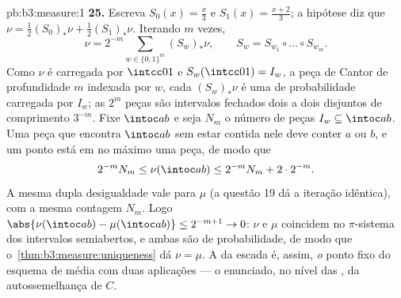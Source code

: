 \begin{solution}{pb:b3:measure:1}
\textbf{25.} Escreva $S_0(x) = \frac x3$ e $S_1(x) =
\frac{x+2}3$; a hipótese diz que $\nu = \frac12(S_0)_*\nu +
\frac12(S_1)_*\nu$. Iterando $m$ vezes,
\[
\nu = 2^{-m}\sum_{w \in \{0,1\}^m}(S_w)_*\nu,
\qquad S_w = S_{w_1}\circ\dots\circ S_{w_m}.
\]
Como $\nu$ é carregada por $\intcc01$ e $S_w(\intcc01) =
I_w$, a peça de Cantor de profundidade $m$ indexada por $w$, cada
$(S_w)_*\nu$ é uma  de probabilidade carregada por $I_w$; as
$2^m$ peças são intervalos fechados dois a dois disjuntos de comprimento
$3^{-m}$. Fixe $\intoc ab$ e seja $N_m$ o número de
peças $I_w \subseteq \intoc ab$. Uma peça que encontra $\intoc ab$
sem estar contida nele deve conter $a$ ou $b$, e um
ponto está em no máximo uma peça, de modo que
\[
2^{-m}N_m \leq \nu(\intoc ab) \leq 2^{-m}N_m + 2\cdot2^{-m}.
\]
A mesma dupla desigualdade vale para $\mu$ (a questão 19 dá
a iteração idêntica), com a mesma contagem $N_m$. Logo
$\abs{\nu(\intoc ab) - \mu(\intoc ab)} \leq 2^{-m+1} \to 0$:
$\nu$ e $\mu$ coincidem no $\pi$-sistema dos intervalos
semiabertos, e ambas são  de probabilidade, de modo que
o~\cref{thm:b3:measure:uniqueness} dá $\nu = \mu$. A
 da escada é, assim, \emph{o} ponto fixo do esquema de
média com duas aplicações --- o enunciado, no nível das ,
da autossemelhança de $C$.
\end{solution}
